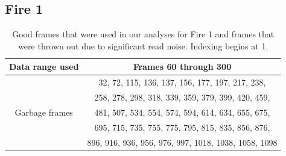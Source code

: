 \documentclass{article}
\begin{document}
\subsection{Fire 1}


\begin{table}
\centering
\begin{tabular}{|c|c|}
\hline
Data range used & Frames 60 through 300 \\
\hline 
               & 32, 72, 115, 136, 137, 156, 177, 197, 217, 238, \\
               & 258, 278, 298, 318, 339, 359, 379, 399, 420, 459,\\
Garbage frames & 481, 507, 534, 554, 574, 594, 614, 634, 655, 675,\\
               & 695, 715, 735, 755, 775, 795, 815, 835, 856, 876,\\
               & 896, 916, 936, 956, 976, 997, 1018, 1038, 1058, 1098\\
\hline
\end{tabular} 

\caption{Good frames that were used in our analyses for Fire 1 and frames that were thrown out due to significant read noise. Indexing begins at 1.}
\end{table}
\end{document}
